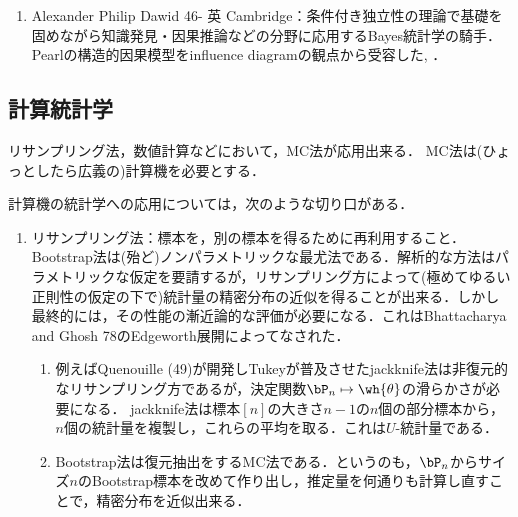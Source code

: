 \documentclass[uplatex,dvipdfmx]{jsreport}
\begin{document}
\begin{history}\mbox{}
    \begin{enumerate}
        \item Alexander Philip Dawid 46- 英 Cambridge：条件付き独立性の理論で基礎を固めながら知識発見・因果推論などの分野に応用するBayes統計学の騎手．Pearlの構造的因果模型をinfluence diagramの観点から受容した\cite{Dawid00-Causal}, \cite{Dawid02-InfluenceDiagram}．
    \end{enumerate}
\end{history}

\subsection{計算統計学}

\begin{tcolorbox}[colframe=ForestGreen, colback=ForestGreen!10!white,breakable,colbacktitle=ForestGreen!40!white,coltitle=black,fonttitle=\bfseries\sffamily,
title=]
    リサンプリング法，数値計算などにおいて，MC法が応用出来る．
    MC法は(ひょっとしたら広義の)計算機を必要とする．
\end{tcolorbox}

\begin{remarks}[計算統計学について]
    計算機の統計学への応用については，次のような切り口がある．
    \begin{enumerate}
        \item リサンプリング法：標本を，別の標本を得るために再利用すること．
        Bootstrap法は(殆ど)ノンパラメトリックな最尤法である．解析的な方法はパラメトリックな仮定を要請するが，リサンプリング方によって(極めてゆるい正則性の仮定の下で)統計量の精密分布の近似を得ることが出来る．しかし最終的には，その性能の漸近論的な評価が必要になる．これはBhattacharya and Ghosh 78のEdgeworth展開によってなされた．
        \begin{enumerate}
            \item 例えばQuenouille (49)が開発しTukeyが普及させたjackknife法は非復元的なリサンプリング方であるが，決定関数$\bP_n\mapsto\wh{\theta}$の滑らかさが必要になる．
            jackknife法は標本$[n]$の大きさ$n-1$の$n$個の部分標本から，$n$個の統計量を複製し，これらの平均を取る．これは$U$-統計量である．
            \item Bootstrap法は復元抽出をするMC法である．というのも，$\bP_n$からサイズ$n$のBootstrap標本を改めて作り出し，推定量を何通りも計算し直すことで，精密分布を近似出来る．
        \end{enumerate}

    \end{enumerate}
\end{remarks}
\end{document}
